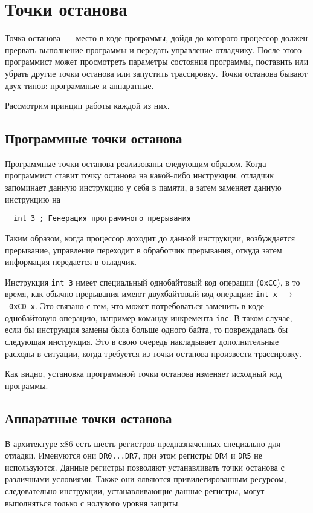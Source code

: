 \section{Точки останова}
Точка останова~--- место в коде программы, дойдя до которого процессор должен
прервать выполнение программы и передать управление отладчику. После этого
программист может просмотреть параметры состояния программы, поставить или
убрать другие точки останова или запустить трассировку. Точки останова бывают
двух типов: программные и аппаратные.

Рассмотрим принцип работы каждой из них.

\subsection{Программные точки останова}
Программные точки останова реализованы следующим образом. Когда программист
ставит точку останова на какой-либо инструкции, отладчик запоминает данную
инструкцию у себя в памяти, а затем заменяет данную инструкцию на 
\begin{verbatim}
  int 3 ; Генерация программного прерывания
\end{verbatim}
Таким образом, когда процессор доходит до данной инструкции, возбуждается
прерывание, управление переходит в обработчик прерывания, откуда затем
информация передается в отладчик. 

Инструкция \verb!int 3! имеет специальный однобайтовый код операции
(\verb!0xCC!), в то время, как обычно прерывания имеют двухбайтовый код
операции: \verb!int x!~$\to$~\verb!0xCD x!. Это связано с тем, что может
потребоваться заменить в коде однобайтовую операцию, например команду инкремента
\verb!inc!. В таком случае, если бы инструкция замены была больше одного
байта, то повреждалась бы следующая инструкция. Это в свою очередь накладывает
дополнительные расходы в ситуации, когда требуется из точки останова произвести
трассировку.

Как видно, установка программной точки останова изменяет исходный код
программы.

\subsection{Аппаратные точки останова}
В архитектуре x86 есть шесть регистров предназначенных специально для отладки.
Именуются они \verb!DR0...DR7!, при этом регистры \verb!DR4! и \verb!DR5! не
используются. Данные регистры позволяют устанавливать точки останова с
различными условиями. Также они ялвяются привилегированным ресурсом,
следовательно инструкции, устанавливающие данные регистры, могут выполняться
только с нолувого уровня защиты.

